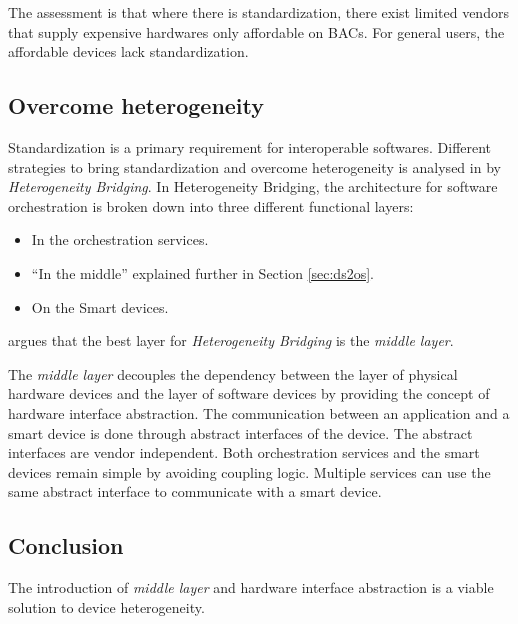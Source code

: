 The assessment is that where there is standardization, there exist limited vendors that supply expensive hardwares only affordable on BACs. For general users, the affordable devices lack standardization.

\subsection{Overcome heterogeneity}

Standardization is a primary requirement for interoperable softwares. Different strategies to bring standardization and overcome heterogeneity is analysed in \cite{pahl2014distributed} by \emph{Heterogeneity Bridging}. In Heterogeneity Bridging, the architecture for software orchestration is broken down into three different functional layers:

\begin{itemize}
  \item In the orchestration services.
  \item ``In the middle'' explained further in Section \ref{sec:ds2os}.
  \item On the Smart devices.
\end{itemize}

\cite{pahl2014distributed} argues that the best layer for \emph{Heterogeneity Bridging} is the \emph{middle layer}. 

The \emph{middle layer} decouples the dependency between the layer of physical hardware devices and the layer of software devices by providing the concept of hardware interface abstraction. The communication between an application and a smart device is done through abstract interfaces of the device. The abstract interfaces are vendor independent. Both orchestration services and the smart devices remain simple by avoiding coupling logic. Multiple services can use the same abstract interface to communicate with a smart device.

\subsection*{Conclusion}

The introduction of \emph{middle layer} and hardware interface abstraction is a viable solution to device heterogeneity.